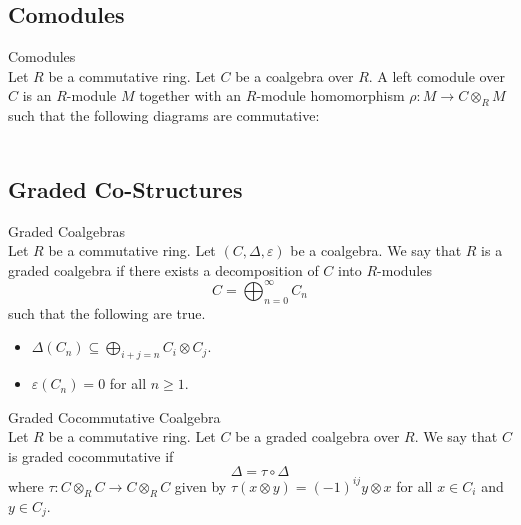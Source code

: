 \documentclass[a4paper]{article}
\begin{document}
\subsection{Comodules}
\begin{defn}{Comodules}{}\\
Let $R$ be a commutative ring. Let $C$ be a coalgebra over $R$. A left comodule over $C$ is an $R$-module $M$ together with an $R$-module homomorphism $\rho:M\to C\otimes_RM$ such that the following diagrams are commutative: \\
 \\
\end{defn}

\subsection{Graded Co-Structures}
\begin{defn}{Graded Coalgebras}{}\\
Let $R$ be a commutative ring. Let $(C,\Delta,\varepsilon)$ be a coalgebra. We say that $R$ is a graded coalgebra if there exists a decomposition of $C$ into $R$-modules $$C=\bigoplus_{n=0}^\infty C_n$$ such that the following are true. 
\begin{itemize}
\item $\Delta(C_n)\subseteq\bigoplus_{i+j=n}C_i\otimes C_j$. 
\item $\varepsilon(C_n)=0$ for all $n\geq 1$. 
\end{itemize}
\end{defn}

\begin{defn}{Graded Cocommutative Coalgebra}{}\\
Let $R$ be a commutative ring. Let $C$ be a graded coalgebra over $R$. We say that $C$ is graded cocommutative if $$\Delta=\tau\circ\Delta$$ where $\tau:C\otimes_RC\to C\otimes_RC$ given by $\tau(x\otimes y)=(-1)^{ij}y\otimes x$ for all $x\in C_i$ and $y\in C_j$. 
\end{defn}
\end{document}
